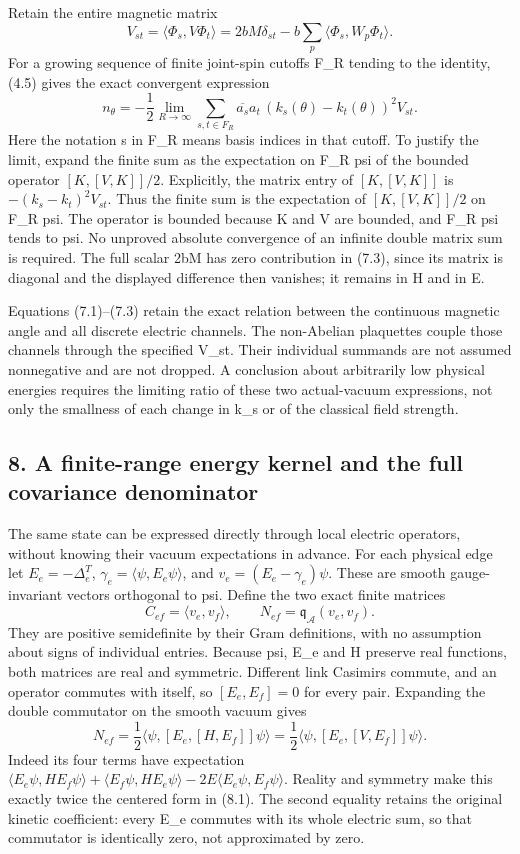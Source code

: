 \documentclass[
  11pt,
]{article}
\begin{document}
Retain the entire magnetic matrix \[
 V_{st}=\langle\Phi_s,V\Phi_t\rangle
 =2bM\delta_{st}-b\sum_p\langle\Phi_s,W_p\Phi_t\rangle.
\] For a growing sequence of finite joint-spin cutoffs F\_R tending to
the identity, (4.5) gives the exact convergent expression \[
 n_\theta=-\frac12\lim_{R\to\infty}
 \sum_{s,t\in F_R}\overline{a_s}a_t\,
 (k_s(\theta)-k_t(\theta))^2 V_{st}.
\tag{7.3}
\] Here the notation s in F\_R means basis indices in that cutoff. To
justify the limit, expand the finite sum as the expectation on F\_R psi
of the bounded operator \([K,[V,K]]/2\). Explicitly, the matrix entry of
\([K,[V,K]]\) is \(-(k_s-k_t)^2V_{st}\). Thus the finite sum is the
expectation of \([K,[V,K]]/2\) on F\_R psi. The operator is bounded
because K and V are bounded, and F\_R psi tends to psi. No unproved
absolute convergence of an infinite double matrix sum is required. The
full scalar 2bM has zero contribution in (7.3), since its matrix is
diagonal and the displayed difference then vanishes; it remains in H and
in E.

Equations (7.1)--(7.3) retain the exact relation between the continuous
magnetic angle and all discrete electric channels. The non-Abelian
plaquettes couple those channels through the specified V\_st. Their
individual summands are not assumed nonnegative and are not dropped. A
conclusion about arbitrarily low physical energies requires the limiting
ratio of these two actual-vacuum expressions, not only the smallness of
each change in k\_s or of the classical field strength.

\subsection{8. A finite-range energy kernel and the full covariance
denominator}\label{magnetic-part-1-a-finite-range-energy-kernel-and-the-full-covariance-denominator}

The same state can be expressed directly through local electric
operators, without knowing their vacuum expectations in advance. For
each physical edge let \(E_e=-\Delta_e^T\),
\(\gamma_e=\langle\psi,E_e\psi\rangle\), and \(v_e=(E_e-\gamma_e)\psi\).
These are smooth gauge-invariant vectors orthogonal to psi. Define the
two exact finite matrices \[
 C_{ef}=\langle v_e,v_f\rangle,
 \qquad N_{ef}=\mathfrak q_{\mathcal A}(v_e,v_f).
\tag{8.1}
\] They are positive semidefinite by their Gram definitions, with no
assumption about signs of individual entries. Because psi, E\_e and H
preserve real functions, both matrices are real and symmetric. Different
link Casimirs commute, and an operator commutes with itself, so
\([E_e,E_f]=0\) for every pair. Expanding the double commutator on the
smooth vacuum gives \[
 \boxed{N_{ef}=\frac12\langle\psi,[E_e,[H,E_f]]\psi\rangle
              =\frac12\langle\psi,[E_e,[V,E_f]]\psi\rangle.}
\tag{8.2}
\] Indeed its four terms have expectation
\(\langle E_e\psi,HE_f\psi\rangle+
\langle E_f\psi,HE_e\psi\rangle-
2E\langle E_e\psi,E_f\psi\rangle\). Reality and symmetry make this
exactly twice the centered form in (8.1). The second equality retains
the original kinetic coefficient: every E\_e commutes with its whole
electric sum, so that commutator is identically zero, not approximated
by zero.
\end{document}

